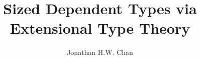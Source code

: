 \documentclass[oneside,onehalfspacing,11pt]{ubcdiss}
\title{Sized Dependent Types via Extensional Type Theory}
\author{Jonathan {\footnotesize H.W. \relax}Chan}
\begin{document}
\maketitle
\makecommitteepage
\textspacing





\tableofcontents
\listoftables
\listoffigures




\mainmatter
\setcounter{chapter}{-1}








\begin{singlespace}
\raggedright

\end{singlespace}

\appendix


\backmatter
\printindex
\end{document}
